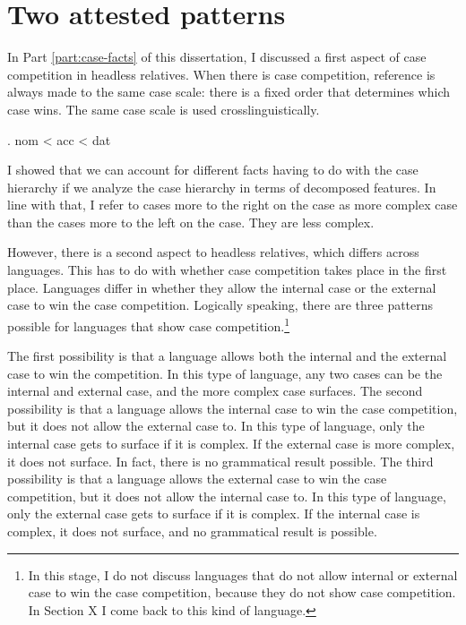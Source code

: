 
\chapter{Two attested patterns}

In Part \ref{part:case-facts} of this dissertation, I discussed a first aspect of case competition in headless relatives. When there is case competition, reference is always made to the same case scale: there is a fixed order that determines which case wins. The same case scale is used crosslinguistically.

\ex. \ac{nom} < \ac{acc} < \ac{dat}\label{ex:case-scale-two-patterns}

I showed that we can account for different facts having to do with the case hierarchy if we analyze the case hierarchy in terms of decomposed features. In line with that, I refer to cases more to the right on the case as more complex case than the cases more to the left on the case. They are less complex.

However, there is a second aspect to headless relatives, which differs across languages. This has to do with whether case competition takes place in the first place. Languages differ in whether they allow the internal case or the external case to win the case competition. Logically speaking, there are three patterns possible for languages that show case competition.\footnote{
In this stage, I do not discuss languages that do not allow internal or external case to win the case competition, because they do not show case competition. In Section X I come back to this kind of language.
}

The first possibility is that a language allows both the internal and the external case to win the competition. In this type of language, any two cases can be the internal and external case, and the more complex case surfaces.
The second possibility is that a language allows the internal case to win the case competition, but it does not allow the external case to. In this type of language, only the internal case gets to surface if it is complex. If the external case is more complex, it does not surface. In fact, there is no grammatical result possible.
The third possibility is that a language allows the external case to win the case competition, but it does not allow the internal case to. In this type of language, only the external case gets to surface if it is complex. If the internal case is complex, it does not surface, and no grammatical result is possible.

